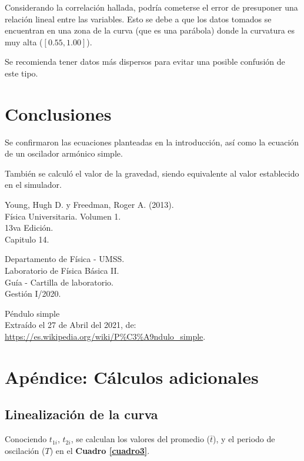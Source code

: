 \documentclass[letter,11pt]{article}
\begin{document}
Considerando la correlación hallada, podría cometerse el error de presuponer una
relación lineal entre las variables. Esto se debe a que los datos tomados se
encuentran en una zona de la curva (que es una parábola) donde la curvatura es
muy alta ($[0.55, 1.00]$).

Se recomienda tener datos más dispersos para evitar una posible confusión de
este tipo.

\section{Conclusiones}

Se confirmaron las ecuaciones planteadas en la introducción, así como la
ecuación de un oscilador armónico simple.

También se calculó el valor de la gravedad, siendo equivalente al valor
establecido en el simulador.

\begin{thebibliography}{99}

 Young, Hugh D. y Freedman, Roger A. (2013).\\
Física Universitaria. Volumen 1.\\
13va Edición.\\
Capitulo 14.

 Departamento de Física - UMSS.\\
Laboratorio de Física Básica II.\\
Guía - Cartilla de laboratorio.\\
Gestión I/2020.

 Péndulo simple \\
Extraído el 27 de Abril del 2021, de: \\
\url{https://es.wikipedia.org/wiki/P%C3%A9ndulo_simple}.

\end{thebibliography}

\newpage
\section*{Apéndice: Cálculos adicionales}

\subsection{Linealización de la curva}

Conociendo $t_{1i}$, $t_{2i}$, se calculan los valores del promedio ($\bar{t}$),
y el periodo de oscilación ($T$) en el \textbf{Cuadro \ref{cuadro3}}.
\end{document}

